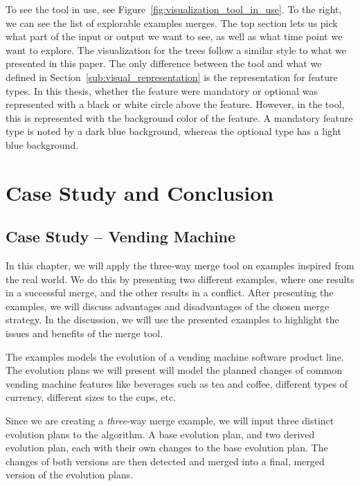 \documentclass[a4paper,english]{ifimaster}
\begin{document}
To see the tool in use, see Figure~\ref{fig:visualization_tool_in_use}. To the right, we can see the list of explorable examples merges. The top section lets us pick what part of the input or output we want to see, as well as what time point we want to explore. The visualization for the trees follow a similar style to what we presented in this paper. The only difference between the tool and what we defined in Section~\vref{sub:visual_representation} is the representation for feature types. In this thesis, whether the feature were mandatory or optional was represented with a black or white circle above the feature. However, in the tool, this is represented with the background color of the feature. A mandatory feature type is noted by a dark blue background, whereas the optional type has a light blue background.

\part{Case Study and Conclusion}%
\label{prt:case_study_and_conclusion}

\chapter{Case Study – Vending Machine}%
\label{cha:case_study_vending_machine}

In this chapter, we will apply the three-way merge tool on examples inspired from the real world. We do this by presenting two different examples, where one results in a successful merge, and the other results in a conflict. After presenting the examples, we will discuss advantages and disadvantages of the chosen merge strategy. In the discussion, we will use the presented examples to highlight the issues and benefits of the merge tool.

The examples models the evolution of a vending machine software product line. The evolution plans we will present will model the planned changes of common vending machine features like beverages such as tea and coffee, different types of currency, different sizes to the cups, etc.

Since we are creating a \textit{three}-way merge example, we will input three distinct evolution plans to the algorithm. A base evolution plan, and two derived evolution plan, each with their own changes to the base evolution plan. The changes of both versions are then detected and merged into a final, merged version of the evolution plans.
\end{document}
